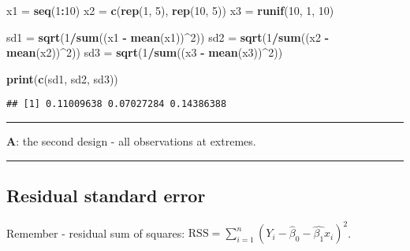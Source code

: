 \documentclass[]{article}
\newenvironment{Shaded}{\begin{snugshade}}{\end{snugshade}}
\newcommand{\DecValTok}[1]{\textcolor[rgb]{0.00,0.00,0.81}{#1}}
\newcommand{\KeywordTok}[1]{\textcolor[rgb]{0.13,0.29,0.53}{\textbf{#1}}}
\newcommand{\NormalTok}[1]{#1}
\newcommand{\OperatorTok}[1]{\textcolor[rgb]{0.81,0.36,0.00}{\textbf{#1}}}
\newcommand{\StringTok}[1]{\textcolor[rgb]{0.31,0.60,0.02}{#1}}
\begin{document}
\begin{Shaded}
\begin{Highlighting}[]
\NormalTok{x1 =}\StringTok{ }\KeywordTok{seq}\NormalTok{(}\DecValTok{1}\OperatorTok{:}\DecValTok{10}\NormalTok{)}
\NormalTok{x2 =}\StringTok{ }\KeywordTok{c}\NormalTok{(}\KeywordTok{rep}\NormalTok{(}\DecValTok{1}\NormalTok{, }\DecValTok{5}\NormalTok{), }\KeywordTok{rep}\NormalTok{(}\DecValTok{10}\NormalTok{, }\DecValTok{5}\NormalTok{))}
\NormalTok{x3 =}\StringTok{ }\KeywordTok{runif}\NormalTok{(}\DecValTok{10}\NormalTok{, }\DecValTok{1}\NormalTok{, }\DecValTok{10}\NormalTok{)}

\NormalTok{sd1 =}\StringTok{ }\KeywordTok{sqrt}\NormalTok{(}\DecValTok{1}\OperatorTok{/}\KeywordTok{sum}\NormalTok{((x1 }\OperatorTok{-}\StringTok{ }\KeywordTok{mean}\NormalTok{(x1))}\OperatorTok{^}\DecValTok{2}\NormalTok{))}
\NormalTok{sd2 =}\StringTok{ }\KeywordTok{sqrt}\NormalTok{(}\DecValTok{1}\OperatorTok{/}\KeywordTok{sum}\NormalTok{((x2 }\OperatorTok{-}\StringTok{ }\KeywordTok{mean}\NormalTok{(x2))}\OperatorTok{^}\DecValTok{2}\NormalTok{))}
\NormalTok{sd3 =}\StringTok{ }\KeywordTok{sqrt}\NormalTok{(}\DecValTok{1}\OperatorTok{/}\KeywordTok{sum}\NormalTok{((x3 }\OperatorTok{-}\StringTok{ }\KeywordTok{mean}\NormalTok{(x3))}\OperatorTok{^}\DecValTok{2}\NormalTok{))}

\KeywordTok{print}\NormalTok{(}\KeywordTok{c}\NormalTok{(sd1, sd2, sd3))}
\end{Highlighting}
\end{Shaded}

\begin{verbatim}
## [1] 0.11009638 0.07027284 0.14386388
\end{verbatim}

\begin{center}\rule{0.5\linewidth}{\linethickness}\end{center}

\textbf{A}: the second design - all observations at extremes.

\begin{center}\rule{0.5\linewidth}{\linethickness}\end{center}

\hypertarget{residual-standard-error}{%
\subsection{Residual standard error}\label{residual-standard-error}}

Remember - residual sum of squares:
\(\text{RSS}=\sum_{i=1}^n (Y_i-\hat{\beta}_0-\hat{\beta_1}x_{i})^2\).
\end{document}
